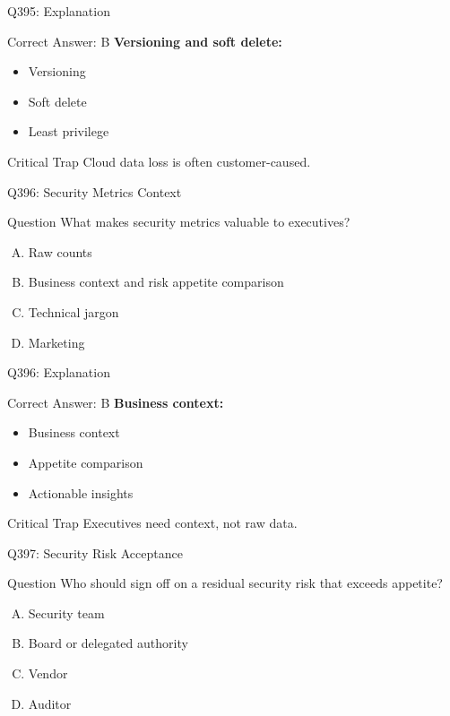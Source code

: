 \documentclass{beamer}
\begin{document}
	\begin{frame}{Q395: Explanation}
		\begin{block}{Correct Answer: B}
			\textbf{Versioning and soft delete:}
			\begin{itemize}
				\item Versioning
				\item Soft delete
				\item Least privilege
			\end{itemize}
		\end{block}
		\begin{alertblock}{Critical Trap}
			Cloud data loss is often customer-caused.
		\end{alertblock}
	\end{frame}
	
	\begin{frame}{Q396: Security Metrics Context}
		\begin{block}{Question}
			What makes security metrics valuable to executives?
		\end{block}
		\begin{enumerate}[(A)]
			\item Raw counts
			\item Business context and risk appetite comparison
			\item Technical jargon
			\item Marketing
		\end{enumerate}
	\end{frame}
	
	\begin{frame}{Q396: Explanation}
		\begin{block}{Correct Answer: B}
			\textbf{Business context:}
			\begin{itemize}
				\item Business context
				\item Appetite comparison
				\item Actionable insights
			\end{itemize}
		\end{block}
		\begin{alertblock}{Critical Trap}
			Executives need context, not raw data.
		\end{alertblock}
	\end{frame}
	
	\begin{frame}{Q397: Security Risk Acceptance}
		\begin{block}{Question}
			Who should sign off on a residual security risk that exceeds appetite?
		\end{block}
		\begin{enumerate}[(A)]
			\item Security team
			\item Board or delegated authority
			\item Vendor
			\item Auditor
		\end{enumerate}
	\end{frame}
	
\end{document}
